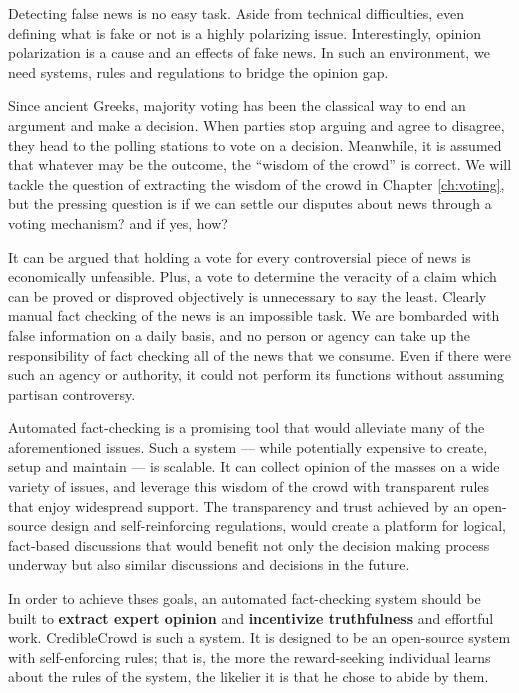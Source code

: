 \documentclass{report}
\theoremstyle{definition}
\begin{document}
Detecting false news is no easy task. Aside from technical difficulties, even defining what is fake or not is a highly polarizing issue. Interestingly, opinion polarization is a cause and an effects of fake news. In such an environment, we need systems, rules and regulations to bridge the opinion gap.

Since ancient Greeks, majority voting has been the classical way to end an argument and make a decision. When parties stop arguing and agree to disagree, they head to the polling stations to vote on a decision. Meanwhile, it is assumed that whatever may be the outcome, the ``wisdom of the crowd'' is correct. We will tackle the question of extracting the wisdom of the crowd in Chapter \ref{ch:voting}, but the pressing question is if we can settle our disputes about news through a voting mechanism? and if yes, how?

It can be argued that holding a vote for every controversial piece of news is economically unfeasible. Plus, a vote to determine the veracity of a claim which can be proved or disproved objectively is unnecessary to say the least.
Clearly manual fact checking of the news is an impossible task. We are bombarded with false information on a daily basis, and no person or agency can take up the responsibility of fact checking all of the news that we consume. Even if there were such an agency or authority, it could not perform its functions without assuming partisan controversy.

Automated fact-checking is a promising tool that would alleviate many of the aforementioned issues. Such a system --- while potentially expensive to create, setup and maintain --- is scalable. It can collect opinion of the masses on a wide variety of issues, and leverage this wisdom of the crowd with transparent rules that enjoy widespread support. The transparency and trust achieved by an open-source design and self-reinforcing regulations, would create a platform for logical, fact-based discussions that would benefit not only the decision making process underway but also similar discussions and decisions in the future.

In order to achieve thses goals, an automated fact-checking system should be built to \textbf{extract expert opinion} and \textbf{incentivize truthfulness} and effortful work. CredibleCrowd is such a system. It is designed to be an open-source system with self-enforcing rules; that is, the more the reward-seeking individual learns about the rules of the system, the likelier it is that he chose to abide by them.
\end{document}
